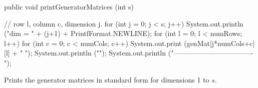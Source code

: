 \begin{code}

   public void printGeneratorMatrices (int s) \begin{hide} {
      // row l, column c, dimension j.
      for (int j = 0; j < s; j++) {
         System.out.println ("dim = " + (j+1) + PrintfFormat.NEWLINE);
         for (int l = 0; l < numRows; l++) {
            for (int c = 0; c < numCols; c++)
               System.out.print (genMat[j*numCols+c][l] + "  ");
            System.out.println ("");
         }
         System.out.println ("----------------------------------");
      }
   }\end{hide}
\end{code}
\begin{tabb}
  Prints the generator matrices in standard form for dimensions 1 to $s$.
\end{tabb}

